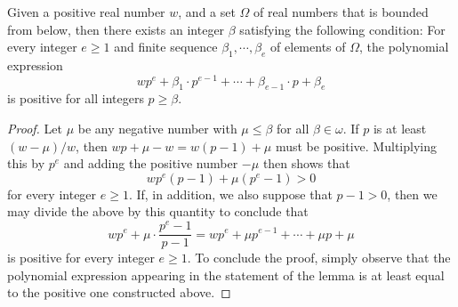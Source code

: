 \documentclass[11pt]{amsart}
\renewcommand{\!}[1]{{\color{red}\text{$\star$\,}#1\,$\star$}}
\begin{document}
\newpage


\begin{lemma}
\label{positive polynomial: L}
Given a positive real number $w$, and a set $\Omega$ of real numbers that is bounded from below, then there exists an integer $\beta$ satisfying the following condition:  For every integer $e \geq 1$ and finite sequence $\beta_1, \cdots, \beta_e$ of elements of $\Omega$, the polynomial expression \[ wp^{e} + \beta_1 \cdot p^{e-1} + \cdots + \beta_{e-1} \cdot p + \beta_e  \] is positive for all integers $p \geq \beta$.
\end{lemma}

\begin{proof}
Let $\mu$ be any negative number with $\mu \leq \beta$ for all $\beta \in \omega$.    If $p$ is at least $(w-\mu)/w$, then $wp + \mu - w = w(p-1) + \mu$ must be positive.  Multiplying this by $p^e$ and adding the positive number $-\mu$ then shows that
%
\[ wp^e ( p-1 ) + \mu (p^e-1) > 0 \] for every integer $e \geq 1$.   If, in addition, we also suppose that $p -1 > 0$, then we may divide the above by this quantity to conclude that \[ w p^e + \mu \cdot \frac{ p^e - 1}{p-1} = wp^e + \mu p^{e-1} + \cdots + \mu p + \mu \] is positive for every integer $e \geq 1$.   To conclude the proof, simply observe that the polynomial expression appearing in the statement of the lemma is at least equal to the positive one constructed above.
\end{proof}
\end{document}
